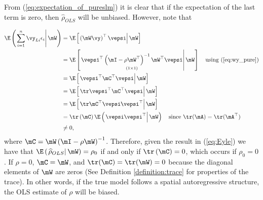 \documentclass[english,12pt]{book}\usepackage[]{graphicx}\usepackage[]{xcolor}
\begin{document}
From (\ref{eq:expectation_of_pureslm}) it is clear that if the expectation of the last term is zero, then $\widehat{\rho}_{OLS}$ will be unbiased. However, note that

\begin{equation}\label{eq:Eyle}
  \begin{aligned}
      \E\left(\left.\sum_{i = 1}^{n}\vy_{Li}\epsilon_i \right| \mW\right) & =  \E\left[\left.\left(\mW\vy \right)^\top\vepsi\right| \mW\right] \\
      & =  \E\left[\left.\underset{(1\times 1)}{\vepsi^\top \left( \mI -\rho \mW^\top\right)^{-1}\mW^\top\vepsi} \right| \mW \right] \quad \mbox{using (\ref{eq:wy_pure})}\\
      & =  \E\left[\left.\vepsi^\top \mC^\top \vepsi \right| \mW\right] \\
      & = \E\left[\left.\tr \vepsi^\top  \mC^\top\vepsi\right|\mW \right] \\
      & = \E\left[\left.\tr \mC^\top \vepsi\vepsi^\top\right| \mW\right] \\
      & =  \tr \left(\mC\right) \E\left(\left.\vepsi\vepsi^\top\right| \mW\right)\quad \mbox{since $\tr(\mA) = \tr(\mA^\top)$} \\
      & \neq 0,
  \end{aligned}
\end{equation}
%
where $\mC = \mW\left( \mI -\rho \mW\right)^{-1}$. Therefore, given the result in (\ref{eq:Eyle}) we have that $\E\left(\left.\widehat{\rho}_{OLS}\right| \mW\right) = \rho_0$ if and only if $\tr \left(\mC\right) = 0$, which occurs if $\rho_0 = 0$. If $\rho = 0$, $\mC = \mW$, and $\tr(\mC) = \tr(\mW) = 0$ because the diagonal elements of $\mW$ are zeros (See Definition \ref{definition:trace} for properties of the trace).  In other words, if the true model follows a spatial autoregressive structure, the OLS estimate of $\rho$ will be biased. 
\end{document}
